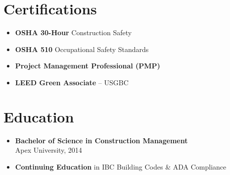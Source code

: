 \documentclass[10pt,letterpaper]{article}
\begin{document}
\vspace{6pt}

\noindent
\begin{minipage}[t]{0.50\textwidth}
  \section*{Certifications}
  \begin{itemize}[leftmargin=1.2em, nosep, label=\small\color{accentcolor}$\bullet$]
    \item \textbf{OSHA 30-Hour} Construction Safety
    \item \textbf{OSHA 510} Occupational Safety Standards
    \item \textbf{Project Management Professional (PMP)}
    \item \textbf{LEED Green Associate} -- USGBC
  \end{itemize}
\end{minipage}%
\begin{minipage}[t]{0.50\textwidth}
  \section*{Education}
  \begin{itemize}[leftmargin=1.2em, nosep, label=\small\color{accentcolor}$\bullet$]
    \item \textbf{Bachelor of Science in Construction Management} \\
          Apex University, 2014
    \item \textbf{Continuing Education} in IBC Building Codes \& ADA Compliance
  \end{itemize}
\end{minipage}
\end{document}
